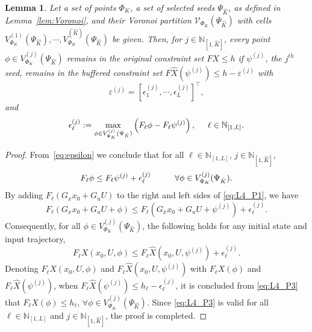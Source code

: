 \documentclass[11pt,letterpaper]{article}
\newtheorem{lemma}{Lemma}
\newcommand{\N}{\mathbb{N}}
\newcommand{\mcV}{\mathcal{V}}
\begin{document}
	\begin{lemma}  \label{lem:buffer}
		Let a set of points $\Phi_{K}$, a set of selected seeds $\Psi_{\hat{K}}$, as defined in Lemma~\ref{lem:Voronoi}, and their Voronoi partition $\mcV_{\Phi_{K}}(\Psi_{\hat{K}})$ with  cells $V_{\Phi_K}^{(1)}(\Psi_{\hat{K}}),\cdots,V_{\Phi_K}^{(\hat{K})}(\Psi_{\hat{K}})$ be given. Then, for $j\in\N_{[1,\hat{K}]}$, every point $\phi\in V_{\Phi_K}^{(j)}(\Psi_{\hat{K}})$ remains in the original constraint set $FX\leq h$ if  $\psi^{(j)}$, the $j^{th}$ seed, remains in the buffered constraint set $F\hat{X}(\psi^{(j)})\leq h-\varepsilon^{(j)}$ with   
		\begin{equation} \label{eq:varepsilon}
		\varepsilon^{(j)}=\left[{\epsilon_{1}^{(j)}},\cdots,{\epsilon_{L}^{(j)}}\right]^{\top},
		\end{equation}
		and
		\begin{equation} \label{eq:epsilon}
		\epsilon_{\ell}^{(j)}:=\max_{\phi\in V_{\Phi_K}^{(j)}(\Psi_{\hat{K}})} \left(F_{\ell}\phi-F_{\ell}\psi^{(j)}\right), \hspace{5mm} \ell\in\N_{[1,L]}.
		\end{equation} 
\end{lemma}
	\begin{proof}
From~\eqref{eq:epsilon} we conclude that for all $\ell\in\N_{[1,L]}$, $j\in\N_{[1,\hat{K}]}$, 
\begin{equation} \label{eq:L4_P1}
F_{\ell}\phi\leq F_{\ell}\psi^{(j)}+\epsilon_{\ell}^{(j)} \hspace{10mm} \forall \phi\in V_{\Phi_K}^{(j)}(\Psi_{\hat{K}}).
\end{equation}
By adding $F_{\ell}\left(G_{x}x_0+G_{u}U\right)$ to the right and left sides of \eqref{eq:L4_P1}, we have
\begin{equation} \label{eq:L4_P2}
F_{\ell}\left(G_{x}x_0+G_{u}U+\phi\right)\leq F_{\ell}\left(G_{x}x_0+G_{u}U+\psi^{(j)}\right)+\epsilon_{\ell}^{(j)}. 
\end{equation}
Consequently, for all $\phi\in V_{\Phi_K}^{(j)}(\Psi_{\hat{K}})$, the following holds for any initial state and input trajectory, 
\begin{equation} \label{eq:L4_P3}
F_{\ell}X(x_0,U,\phi)\leq F_{\ell}\hat{X}(x_{0},U,\psi^{(j)})+\epsilon_{\ell}^{(j)}.
\end{equation}
Denoting $F_{\ell}X(x_0,U,\phi)$ and $F_{\ell}\hat{X}(x_0,U,\psi^{(j)})$ with $F_{\ell}X(\phi)$ and $F_{\ell}\hat{X}(\psi^{(j)})$, when $F_{\ell}\hat{X}(\psi^{(j)})\leq h_{\ell}-\epsilon_{\ell}^{(j)}$, it is concluded from \eqref{eq:L4_P3} that $F_{\ell}X(\phi)\leq h_{\ell}$, $\forall \phi\in V_{\Phi_K}^{(j)}(\Psi_{\hat{K}})$.  
Since \eqref{eq:L4_P3} is valid for all $\ell\in\N_{[1,L]}$ and $j\in\N_{[1,\hat{K}]}$, the proof is completed. 
\end{proof}
\end{document}
